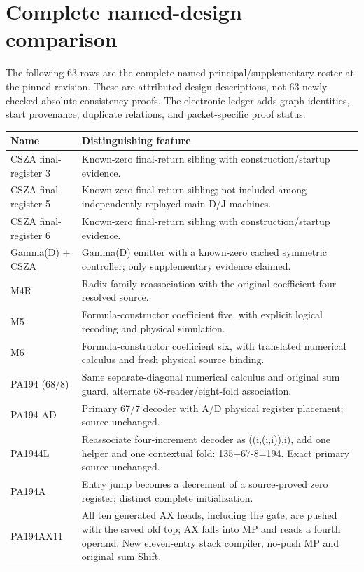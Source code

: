 \clearpage\section{Complete named-design comparison}
\label{app:names}
The following 63 rows are the complete named principal/supplementary roster at the pinned revision. These are attributed design descriptions, not 63 newly checked absolute consistency proofs. The electronic ledger adds graph identities, start provenance, duplicate relations, and packet-specific proof status.
\begingroup\fontsize{9}{10}\selectfont\begin{longtable}{p{}p{}}
\toprule Name & Distinguishing feature \\ \midrule\endhead
CSZA final-register 3 & Known-zero final-return sibling with construction/startup evidence. \\
CSZA final-register 5 & Known-zero final-return sibling; not included among independently replayed main D/J machines. \\
CSZA final-register 6 & Known-zero final-return sibling with construction/startup evidence. \\
Gamma(D) + CSZA & Gamma(D) emitter with a known-zero cached symmetric controller; only supplementary evidence claimed. \\
M4R & Radix-family reassociation with the original coefficient-four resolved source. \\
M5 & Formula-constructor coefficient five, with explicit logical recoding and physical simulation. \\
M6 & Formula-constructor coefficient six, with translated numerical calculus and fresh physical source binding. \\
PA194 (68/8) & Same separate-diagonal numerical calculus and original sum guard, alternate 68-reader/eight-fold association. \\
PA194-AD & Primary 67/7 decoder with A/D physical register placement; source unchanged. \\
PA1944L & Reassociate four-increment decoder as ((i,(i,i)),i), add one helper and one contextual fold: 135+67-8=194. Exact primary source unchanged. \\
PA194A & Entry jump becomes a decrement of a source-proved zero register; distinct complete initialization. \\
PA194AX11 & All ten generated AX heads, including the gate, are pushed with the saved old top; AX falls into MP and reads a fourth operand. New eleven-entry stack compiler, no-push MP and original sum Shift. \\

\end{longtable}
